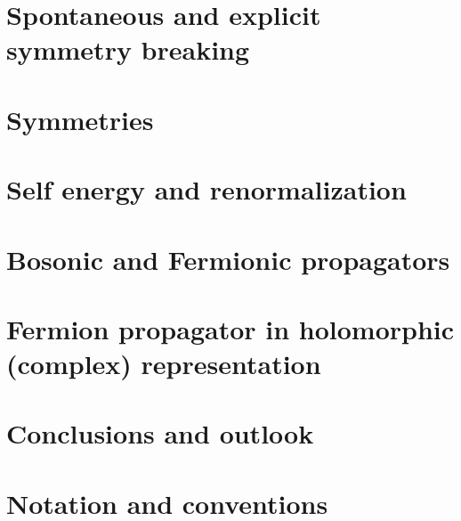 \documentclass[a4paper, 12pt, openany]{book} %
\begin{document}
	

	
	
	\chapter{Spontaneous and explicit symmetry breaking}
	
	\chapter{Symmetries}
	
	
	\chapter{Self energy and renormalization}
	
	
	\chapter{Bosonic and Fermionic propagators}
	
	
	\chapter{Fermion propagator in holomorphic (complex) representation}
	\label{chap:bosonfermionpropagators}
	
	
	\chapter{Conclusions and outlook}
	
	

	\appendix
	
	\chapter{Notation and conventions}
	
	\fancyhf{} %
	\renewcommand{\headrulewidth}{0pt} %
	\fancyfoot[C]{\thepage} %
	
	\setcounter{page}{1}
	
	
	
	
	\newpage

	
	\printbibliography[title=References]
	
\end{document}
